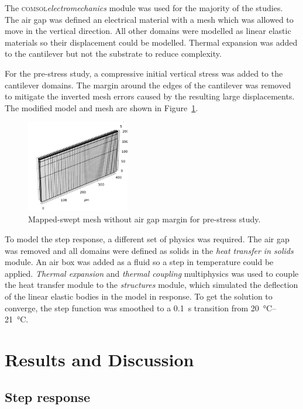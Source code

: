 \documentclass[a4paper,10pt,twocolumn]{article}
\newcommand{\comsol}{\textsc{comsol}\xspace}
\begin{document}
The \comsol \emph{electromechanics} module was used for the majority of the
studies. The air gap was defined an electrical material with a mesh which
was allowed to move in the vertical direction. All other domains were modelled
as linear elastic materials so their displacement could be modelled. 
Thermal expansion was added to the cantilever but not the substrate to
reduce complexity.

For the pre-stress study, a compressive initial vertical stress was added to the
cantilever domains. The margin around the edges of the cantilever was removed to
mitigate the inverted mesh errors caused by the resulting large displacements.
The modified model and mesh are shown in Figure~\ref{fig:pre-stress-mesh}.

\begin{figure}[h]
    \centering
    \includegraphics[width=0.4\textwidth]{img/pre_stress_mesh.png}
    \caption{Mapped-swept mesh without air gap margin for pre-stress study.}
    \label{fig:pre-stress-mesh}
\end{figure}

To model the step response, a different set of physics was required. The air gap
was removed and all domains were defined as solids in the \emph{heat
transfer in solids} module. An air box was added as a fluid so a step in
temperature could be applied. \emph{Thermal expansion} and \emph{thermal
coupling} multiphysics was used to couple the heat transfer module to the
\emph{structures} module, which simulated the deflection of the linear elastic
bodies in the model in response. To get the solution to converge, the step
function was smoothed to a \SI{0.1}{\second} transition from \SIrange{20}{21}
{\celsius}.

\section{Results and Discussion}

\subsection{Step response}
\end{document}
